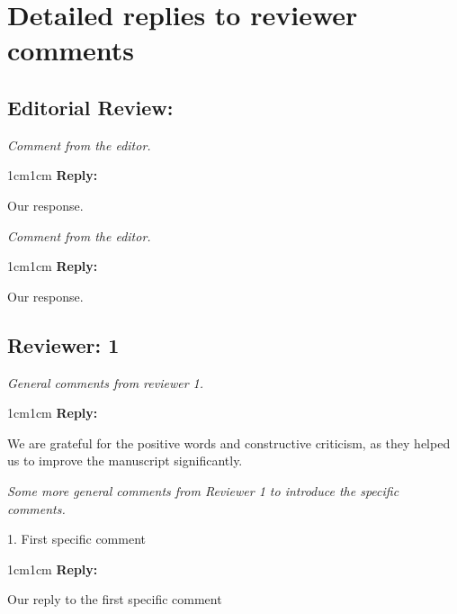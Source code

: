 \documentclass[11pt]{article}
\newenvironment{reviewer}{\itshape}{}
\newenvironment{reply}{%
    \begin{adjustwidth}{1cm}{1cm}%
    \color{grayreply}\textbf{Reply:\ }%
    \ignorespaces%
}{\end{adjustwidth}}
\begin{document}
\section*{Detailed replies to reviewer comments}

\subsection*{Editorial Review:}

\begin{minipage}{\linewidth}
    \begin{reviewer}
        Comment from the editor.
    \end{reviewer}

    \begin{reply}
        Our response.
    \end{reply}
\end{minipage}

\begin{minipage}{\linewidth}
    \begin{reviewer}
        Comment from the editor.
    \end{reviewer}

    \begin{reply}
        Our response.
    \end{reply}
\end{minipage}


\subsection*{Reviewer: 1}

\begin{minipage}{\linewidth}
    \begin{reviewer}
        General comments from reviewer 1.
    \end{reviewer}

    \begin{reply}
        We are grateful for the positive words and constructive criticism, as they helped us to improve the manuscript significantly.
    \end{reply}
\end{minipage}


\begin{minipage}{\linewidth}
    \begin{reviewer}
        Some more general comments from Reviewer 1 to introduce the specific comments.

        1. First specific comment
    \end{reviewer}

    \begin{reply}
        Our reply to the first specific comment
    \end{reply}
\end{minipage}
\end{document}
